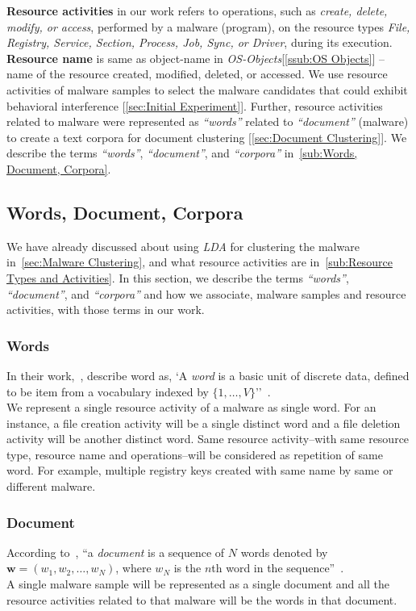 \textbf{Resource activities} in our work refers to operations, such as \emph{create, delete, modify, or access}, performed by a malware (program), on the resource types \emph{File, Registry, Service, Section, Process, Job, Sync, or Driver}, during its execution.
\textbf{Resource name} is same as object-name in \emph{OS-Objects}[\autoref{ssub:OS Objects}] -- name of the resource created, modified, deleted, or accessed.
We use resource activities of malware samples to select the malware candidates that could exhibit behavioral interference [\autoref{sec:Initial Experiment}].
Further, resource activities related to malware were represented as \emph{``words''} related to \emph{``document''} (malware) to create a text corpora for document clustering [\autoref{sec:Document Clustering}].
We describe the terms \emph{``words''}, \emph{``document''}, and \emph{``corpora''} in~\autoref{sub:Words, Document, Corpora}.
\subsection{Words, Document, Corpora}
\label{sub:Words, Document, Corpora}
We have already discussed about using \emph{LDA} for clustering the malware in~\autoref{sec:Malware Clustering}, and what resource activities are in~\autoref{sub:Resource Types and Activities}.
In this section, we describe the terms \emph{``words''}, \emph{``document''}, and \emph{``corpora''} and how we associate, malware samples and resource activities, with those terms in our work.
\subsubsection{Words}
\label{ssub:Words}
In their work,~\citeauthor{Blei}, describe word as, `A \emph{word} is a basic unit of discrete data, defined to be item from a vocabulary indexed by $\{1,\ldots,V\}$''~\cite[]{Blei}.\\
We represent a single resource activity of a malware as single word.
For an instance, a file creation activity will be a single distinct word and a file deletion activity will be another distinct word.
Same resource activity--with same resource type, resource name and operations--will be considered as repetition of same word.
For example, multiple registry keys created with same name by same or different malware.
\subsubsection{Document}
According to~\citeauthor{Blei}, ``a \emph{document} is a sequence of $N$ words denoted by $\textbf{w} = (w_1,w_2,\ldots,w_N)$, where $w_N$ is the $n$th word in the sequence''~\cite[]{Blei}.\\
A single malware sample will be represented as a single document and all the resource activities related to that malware will be the words in that document.
\label{ssub:Document}
